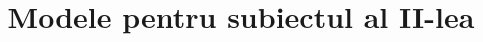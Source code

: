 
\title{Modele pentru subiectul al II-lea}


\ApplySubIIStyling %
\maketitle         %
\tableofcontents   %
\clearpage         %




\clearpage



